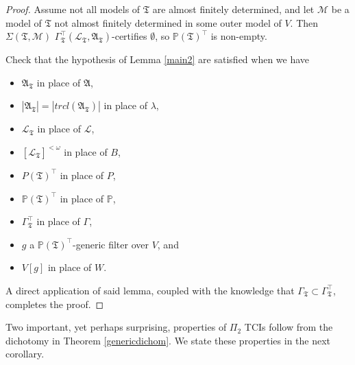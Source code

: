 \documentclass[12pt]{article}
\numberwithin{equation}{section}
\begin{document}
\begin{proof}
Assume not all models of $\mathfrak{T}$ are almost finitely determined, and let $\mathcal{M}$ be a model of $\mathfrak{T}$ not almost finitely determined in some outer model of $V$. Then $\Sigma(\mathfrak{T}, \mathcal{M})$ $\Gamma_{\mathfrak{T}}^{\top} (\mathcal{L}_{\mathfrak{T}}, \mathfrak{A}_{\mathfrak{T}})$-certifies $\emptyset$, so $\mathbb{P}(\mathfrak{T})^{\top}$ is non-empty.

Check that the hypothesis of Lemma \ref{main2} are satisfied when we have 
\begin{itemize}
    \item $\mathfrak{A}_{\mathfrak{T}}$ in place of $\mathfrak{A}$,
    \item $|\mathfrak{A}_{\mathfrak{T}}| = |trcl(\mathfrak{A}_{\mathfrak{T}})|$ in place of $\lambda$,
    \item $\mathcal{L}_{\mathfrak{T}}$ in place of $\mathcal{L}$,
    \item $[\mathcal{L}_{\mathfrak{T}}]^{< \omega}$ in place of $B$,
    \item $P(\mathfrak{T})^{\top}$ in place of $P$,
    \item $\mathbb{P}(\mathfrak{T})^{\top}$ in place of $\mathbb{P}$,
    \item $\Gamma_{\mathfrak{T}}^{\top}$ in place of $\Gamma$, 
    \item $g$ a $\mathbb{P}(\mathfrak{T})^{\top}$-generic filter over $V$, and
    \item $V[g]$ in place of $W$.
\end{itemize}
A direct application of said lemma, coupled with the knowledge that $\Gamma_{\mathfrak{T}} \subset \Gamma_{\mathfrak{T}}^{\top}$, completes the proof. 
\end{proof}

Two important, yet perhaps surprising, properties of $\Pi_2$ TCIs follow from the dichotomy in Theorem \ref{genericdichom}. We state these properties in the next corollary.
\end{document}
